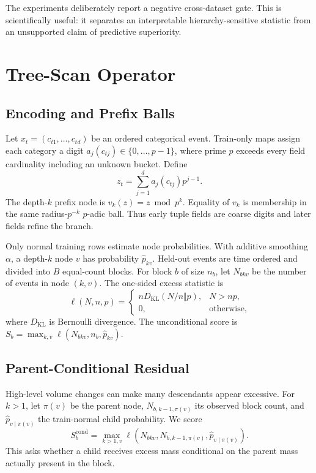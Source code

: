 \documentclass[journal]{IEEEtran}
\begin{document}
The experiments deliberately report a negative cross-dataset gate. This is scientifically useful: it separates an interpretable hierarchy-sensitive statistic from an unsupported claim of predictive superiority.

\section{Tree-Scan Operator}
\subsection{Encoding and Prefix Balls}
Let $x_t=(c_{t1},\ldots,c_{td})$ be an ordered categorical event. Train-only maps assign each category a digit $a_j(c_{tj})\in\{0,\ldots,p-1\}$, where prime $p$ exceeds every field cardinality including an unknown bucket. Define
\begin{equation}
 z_t=\sum_{j=1}^{d} a_j(c_{tj})p^{j-1}.
\end{equation}
The depth-$k$ prefix node is $v_k(z)=z\bmod p^k$. Equality of $v_k$ is membership in the same radius-$p^{-k}$ $p$-adic ball. Thus early tuple fields are coarse digits and later fields refine the branch.

Only normal training rows estimate node probabilities. With additive smoothing $\alpha$, a depth-$k$ node $v$ has probability $\hat p_{kv}$. Held-out events are time ordered and divided into $B$ equal-count blocks. For block $b$ of size $n_b$, let $N_{bkv}$ be the number of events in node $(k,v)$. The one-sided excess statistic is
\begin{equation}
 \ell(N,n,p)=
 \begin{cases}
 nD_{\mathrm{KL}}(N/n\Vert p),&N>np,\\
 0,&\text{otherwise},
 \end{cases}
\end{equation}
where $D_{\mathrm{KL}}$ is Bernoulli divergence. The unconditional score is $S_b=\max_{k,v}\ell(N_{bkv},n_b,\hat p_{kv})$.

\subsection{Parent-Conditional Residual}
High-level volume changes can make many descendants appear excessive. For $k>1$, let $\pi(v)$ be the parent node, $N_{b,k-1,\pi(v)}$ its observed block count, and $\hat p_{v\mid\pi(v)}$ the train-normal child probability. We score
\begin{equation}
 S_b^{\mathrm{cond}}=\max_{k>1,v}\ell\!\left(N_{bkv},N_{b,k-1,\pi(v)},\hat p_{v\mid\pi(v)}\right).
\end{equation}
This asks whether a child receives excess mass conditional on the parent mass actually present in the block.
\end{document}
